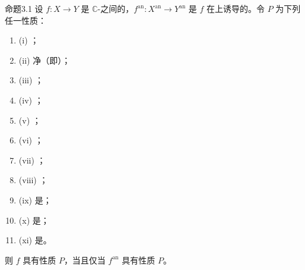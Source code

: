\begin{SGAresult}{命题}{3.1}
设 $f:X\to Y$ 是 $\mathbb C$-之间的，$f^{\mathrm{an}}:X^{\mathrm{an}}\to Y^{\mathrm{an}}$ 是 $f$ 在上诱导的。令 $P$ 为下列任一性质：
\begin{enumerate}[label={}]
\item (i) ；
\item (ii) 净（即）；
\item (iii) ；
\item (iv) ；
\item (v) ；
\item (vi) ；
\item (vii) ；
\item (viii) ；
\item (ix) 是；
\item (x) 是；
\item (xi) 是。
\end{enumerate}
则 $f$ 具有性质 $P$，当且仅当 $f^{\mathrm{an}}$ 具有性质 $P$。
\end{SGAresult}
